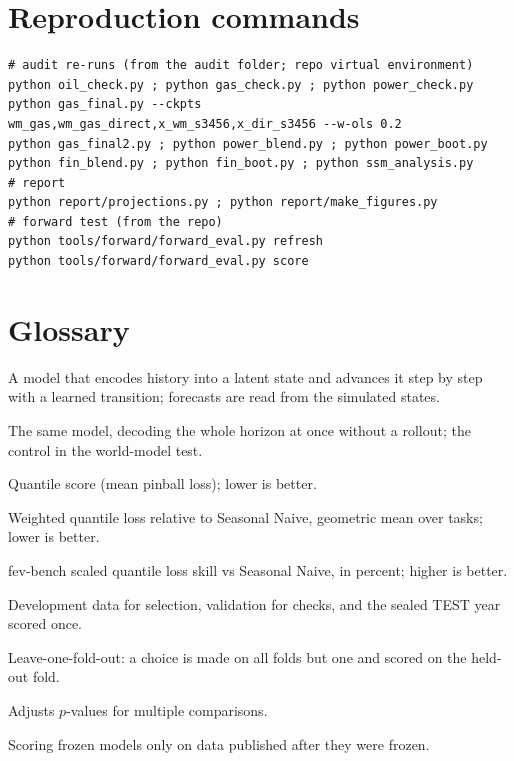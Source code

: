 \documentclass[10pt,a4paper]{article}
\begin{document}
\section{Reproduction commands}
\begin{verbatim}
# audit re-runs (from the audit folder; repo virtual environment)
python oil_check.py ; python gas_check.py ; python power_check.py
python gas_final.py --ckpts wm_gas,wm_gas_direct,x_wm_s3456,x_dir_s3456 --w-ols 0.2
python gas_final2.py ; python power_blend.py ; python power_boot.py
python fin_blend.py ; python fin_boot.py ; python ssm_analysis.py
# report
python report/projections.py ; python report/make_figures.py
# forward test (from the repo)
python tools/forward/forward_eval.py refresh
python tools/forward/forward_eval.py score
\end{verbatim}

\section{Glossary}
\begin{description}[leftmargin=3.2cm,style=nextline,itemsep=1pt]
\item[World model] A model that encodes history into a latent state and advances it step by step with a learned transition; forecasts are read from the simulated states.
\item[Direct twin] The same model, decoding the whole horizon at once without a rollout; the control in the world-model test.
\item[QS] Quantile score (mean pinball loss); lower is better.
\item[wql\_rel] Weighted quantile loss relative to Seasonal Naive, geometric mean over tasks; lower is better.
\item[SQL skill] fev-bench scaled quantile loss skill vs Seasonal Naive, in percent; higher is better.
\item[DEV / VAL / TEST] Development data for selection, validation for checks, and the sealed TEST year scored once.
\item[LOFO] Leave-one-fold-out: a choice is made on all folds but one and scored on the held-out fold.
\item[Holm correction] Adjusts $p$-values for multiple comparisons.
\item[Forward test] Scoring frozen models only on data published after they were frozen.
\end{description}
\end{document}
